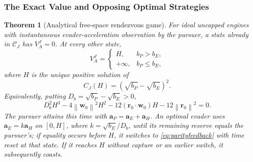 \documentclass[journal,a4paper]{IEEEtran}
\newtheorem{theorem}{Theorem}
\newcommand{\C}{\mathcal C}
\newcommand{\norm}[1]{\left\|#1\right\|}
\begin{document}
\subsubsection{The Exact Value and Opposing Optimal Strategies}
\begin{theorem}[Analytical free-space rendezvous game]
\label{thm:exactJ}
For ideal uncapped engines with instantaneous evader-acceleration observation by the pursuer, a state already in $\C_J$ has $V_A^J=0$. At every other state,
\begin{equation}
 \boxed{V_A^J=
 \begin{cases}
 H,&b_P>b_E,\\
 +\infty,&b_P\le b_E,
 \end{cases}}
 \label{eq:Jvalue}
\end{equation}
where $H$ is the unique positive solution of
\begin{equation}
 \boxed{C_J(H)=(\sqrt{b_P}-\sqrt{b_E})^2.}
 \label{eq:Jtime}
\end{equation}
Equivalently, putting $D_b=\sqrt{b_P}-\sqrt{b_E}>0$,
\begin{equation}
 D_b^2H^3-4\norm{\mathbf w_0}^2H^2
 -12(\mathbf r_0\cdot\mathbf w_0)H-12\norm{\mathbf r_0}^2=0.
 \label{eq:Jcubic}
\end{equation}
The pursuer attains this time with $\mathbf a_P=\mathbf a_E+\mathbf a_H$. An optimal evader uses $\mathbf a_E=k\mathbf a_H$ on $[0,H]$, where $k=\sqrt{b_E}/D_b$, until its remaining reserve equals the pursuer's; if equality occurs before $H$, it switches to \eqref{eq:parityfeedback} with time reset at that state. If it reaches $H$ without capture or an earlier switch, it subsequently coasts.
\end{theorem}
\end{document}
